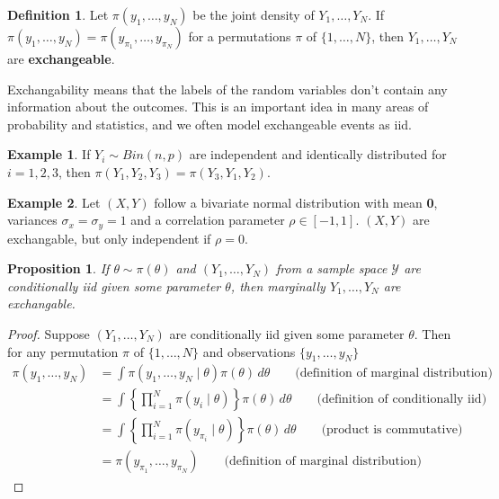 \documentclass[
]{book}
\newtheorem{proposition}{Proposition}[chapter]
\theoremstyle{definition}
\newtheorem{definition}{Definition}[chapter]
\theoremstyle{definition}
\newtheorem{example}{Example}[chapter]
\theoremstyle{definition}
\theoremstyle{definition}
\theoremstyle{remark}
\begin{document}
\begin{definition}
Let \(\pi(y_1, \ldots, y_N)\) be the joint density of \(Y_1, \ldots, Y_N\). If \(\pi(y_1, \ldots, y_N) = \pi(y_{\pi_1}, \ldots, y_{\pi_N})\) for a permutations \(\pi\) of \(\{1, \ldots, N\}\), then \(Y_1, \ldots, Y_N\) are \textbf{exchangeable}.
\end{definition}

Exchangability means that the labels of the random variables don't contain any information about the outcomes. This is an important idea in many areas of probability and statistics, and we often model exchangeable events as iid.

\begin{example}
If \(Y_i \sim Bin(n, p)\) are independent and identically distributed for \(i = 1, 2, 3\), then \(\pi(Y_1, Y_2, Y_3) = \pi(Y_3, Y_1, Y_2)\).
\end{example}

\begin{example}
Let \((X, Y)\) follow a bivariate normal distribution with mean \textbf{0}, variances \(\sigma_x = \sigma_y = 1\) and a correlation parameter \(\rho \in [-1, 1]\). \((X, Y)\) are exchangable, but only independent if \(\rho = 0\).
\end{example}

\begin{proposition}
If \(\theta \sim \pi(\theta)\) and \((Y_1, \ldots, Y_N)\) from a sample space \(\mathcal{Y}\) are conditionally iid given some parameter \(\theta\), then marginally \(Y_1, \ldots, Y_N\) are exchangable.
\end{proposition}

\begin{proof}
Suppose \((Y_1, \ldots, Y_N)\) are conditionally iid given some parameter \(\theta\). Then for any permutation \(\pi\) of \(\{1, \ldots, N\}\) and observations \(\{y_1, \ldots, y_N\}\)
\begin{equation}
\begin{split}
\pi(y_1, \ldots, y_N) &= \int \pi(y_1, \ldots, y_N \mid \theta) \pi(\theta)\, d\theta \qquad \textrm{(definition of marginal distribution)}\\
 & = \int \left\{\prod_{i=1}^N\pi(y_i \mid \theta)\right\} \pi(\theta)\, d\theta \qquad \textrm{(definition of conditionally iid)}\\
& = \int \left\{\prod_{i=1}^N\pi(y_{\pi_i} \mid \theta)\right\} \pi(\theta)\, d\theta \qquad \textrm{(product is commutative)} \\
 & = \pi(y_{\pi_1}, \ldots, y_{\pi_N}) \qquad \textrm{(definition of marginal distribution)}
\end{split}
\end{equation}
\end{proof}
\end{document}
